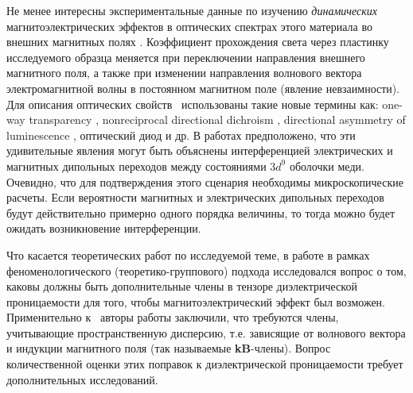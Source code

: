 Не менее интересны экспериментальные данные по изучению \emph{динамических} магнитоэлектрических эффектов в оптических спектрах этого материала во внешних магнитных полях \cite{Saito2008prl, Saito2008jpsj, Lovesey2009, Toyoda2015, Boldyrev2015}. Коэффициент прохождения света через пластинку исследуемого образца меняется при переключении направления внешнего магнитного поля, а также при изменении направления волнового вектора электромагнитной волны в постоянном магнитном поле (явление невзаимности). Для описания оптических свойств \cbo\ использованы такие новые термины как: one-way transparency \cite{Toyoda2015}, nonreciprocal directional dichroism \cite{Toyoda2015}, directional asymmetry of luminescence \cite{Toyoda2016}, оптический диод и др. В работах \cite{Toyoda2015, Toyoda2016} предположено, что эти удивительные явления могут быть объяснены интерференцией электрических и магнитных дипольных переходов между состояниями \(3d^9\) оболочки меди. Очевидно, что для подтверждения этого сценария необходимы микроскопические расчеты. Если вероятности магнитных и электрических дипольных переходов будут действительно примерно одного порядка величины, то тогда можно будет ожидать возникновение интерференции.

Что касается теоретических работ по исследуемой теме, в работе \cite{Nikitchenko2021} в рамках феноменологического (теоретико-группового) подхода исследовался вопрос о том, каковы должны быть дополнительные члены в тензоре диэлектрической проницаемости для того, чтобы магнитоэлектрический эффект был возможен. Применительно к \cbo\ авторы работы \cite{Nikitchenko2021} заключили, что требуются члены, учитывающие пространственную дисперсию, т.е. зависящие от волнового вектора и индукции магнитного поля (так называемые \textbf{kB}-члены). Вопрос количественной оценки этих поправок к диэлектрической проницаемости требует дополнительных исследований.

\FloatBarrier
